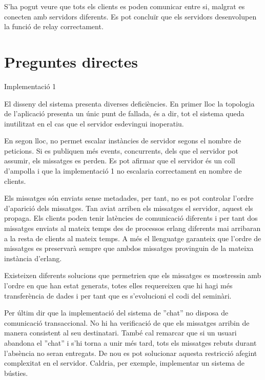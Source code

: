 \documentclass[a4paper, 11pt]{article}
\begin{document}
S'ha pogut veure que tots els clients es poden comunicar entre si, malgrat es conecten amb servidors diferents.
Es pot concluïr que els servidors desenvolupen la funció de relay correctament. 

\section{Preguntes directes}


Implementació 1

El disseny del sistema presenta diverses deficiències. En primer lloc la topologia de l'aplicació presenta un únic punt de fallada, és a dir, tot el sistema queda inutilitzat en el cas que el servidor esdevingui inoperatiu. 

En segon lloc, no permet escalar instàncies de servidor segons el nombre de peticions. Si es publiquen més events, concurrents, dels que el servidor pot assumir, els missatges es perden.
Es pot afirmar que el servidor és un coll d'ampolla i que la implementació 1 no escalaria correctament en nombre de clients. 

Els missatges són enviats sense metadades, per tant, no es pot controlar l'ordre d'aparició dels missatges. Tan aviat arriben els missatges el servidor, aquest els propaga. Els clients poden tenir latències de comunicació diferents i per tant dos missatges enviats al mateix temps des de processos erlang diferents mai arribaran a la resta de clients al mateix temps. A més el llenguatge garanteix que l'ordre de missatges es preservar\`a sempre que ambdos missatges provinguin de la mateixa inst\`ancia d'erlang.

Existeixen diferents solucions que permetrien que els missatges es mostressin amb l'ordre en que han estat generats, totes elles requereixen que hi hagi més transferència de dades i per tant que es s'evolucioni el codi del seminàri. 

Per últim dir que la implementació del sistema de ''chat'' no disposa de comunicació transaccional. No hi ha verificació de que els missatges arribin de manera consistent al seu destinatari. També cal remarcar que si un usuari abandona el ''chat'' i s'hi torna a unir més tard, tots els missatges rebuts durant l'absència no seran entregats. 
De nou es pot solucionar aquesta restricció afegint complexitat en el servidor. Caldria, per exemple, implementar un sistema de bústies. 
\end{document}
